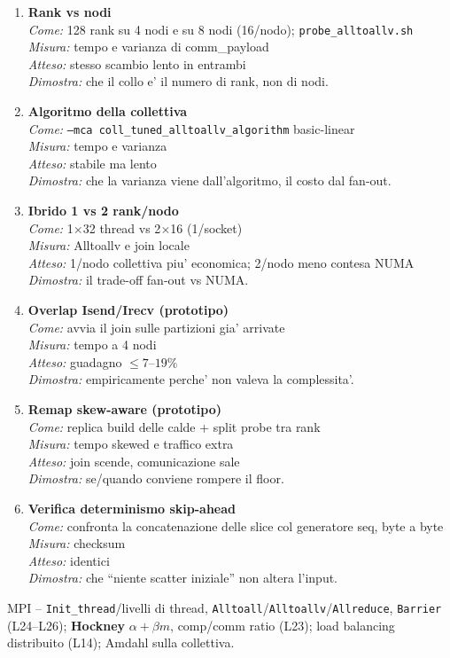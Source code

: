 \documentclass[11pt,a4paper]{article}
\newcommand{\espitem}[5]{\item \textbf{#1}\\ \emph{Come:} #2\\ \emph{Misura:} #3\\ \emph{Atteso:} #4\\ \emph{Dimostra:} #5}
\begin{document}
\begin{espbox}
\begin{enumerate}[leftmargin=1.3em]
\espitem{Rank vs nodi}{128 rank su 4 nodi e su 8 nodi (16/nodo); \texttt{probe\_alltoallv.sh}}{tempo e varianza di comm\_payload}
  {stesso scambio lento in entrambi}{che il collo e' il numero di rank, non di nodi.}
\espitem{Algoritmo della collettiva}{\texttt{--mca coll\_tuned\_alltoallv\_algorithm} basic-linear}{tempo e varianza}
  {stabile ma lento}{che la varianza viene dall'algoritmo, il costo dal fan-out.}
\espitem{Ibrido 1 vs 2 rank/nodo}{1$\times$32 thread vs 2$\times$16 (1/socket)}{Alltoallv e join locale}
  {1/nodo collettiva piu' economica; 2/nodo meno contesa NUMA}{il trade-off fan-out vs NUMA.}
\espitem{Overlap Isend/Irecv (prototipo)}{avvia il join sulle partizioni gia' arrivate}{tempo a 4 nodi}
  {guadagno $\le7$--$19\%$}{empiricamente perche' non valeva la complessita'.}
\espitem{Remap skew-aware (prototipo)}{replica build delle calde + split probe tra rank}{tempo skewed e traffico extra}
  {join scende, comunicazione sale}{se/quando conviene rompere il floor.}
\espitem{Verifica determinismo skip-ahead}{confronta la concatenazione delle slice col generatore seq, byte a byte}{checksum}
  {identici}{che ``niente scatter iniziale'' non altera l'input.}
\end{enumerate}
\end{espbox}

\begin{theorybox}
MPI -- \texttt{Init\_thread}/livelli di thread, \texttt{Alltoall}/\texttt{Alltoallv}/\texttt{Allreduce}, \texttt{Barrier} (L24--L26); \textbf{Hockney} $\alpha+\beta m$, comp/comm ratio (L23); load balancing distribuito (L14); Amdahl sulla collettiva.
\end{theorybox}
\end{document}
